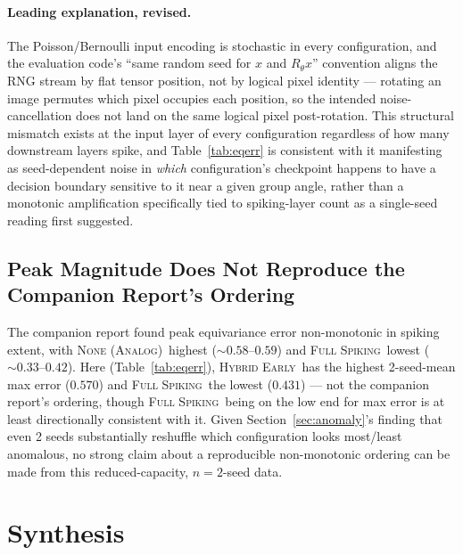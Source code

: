 \documentclass[11pt]{article}
\newcommand{\None}{\textsc{None (Analog)}}
\newcommand{\FullSpiking}{\textsc{Full Spiking}}
\newcommand{\HybridEarly}{\textsc{Hybrid Early}}
\begin{document}
\paragraph{Leading explanation, revised.} The Poisson/Bernoulli input encoding is stochastic in every
configuration, and the evaluation code's ``same random seed for $x$ and $R_\theta x$'' convention
aligns the RNG stream by flat tensor position, not by logical pixel identity --- rotating an image
permutes which pixel occupies each position, so the intended noise-cancellation does not land on the
same logical pixel post-rotation. This structural mismatch exists at the input layer of every
configuration regardless of how many downstream layers spike, and Table~\ref{tab:eqerr} is consistent
with it manifesting as seed-dependent noise in \emph{which} configuration's checkpoint happens to have
a decision boundary sensitive to it near a given group angle, rather than a monotonic amplification
specifically tied to spiking-layer count as a single-seed reading first suggested.

\subsection{Peak Magnitude Does Not Reproduce the Companion Report's Ordering}

The companion report found peak equivariance error non-monotonic in spiking extent, with \None\
highest ($\sim 0.58$--$0.59$) and \FullSpiking\ lowest ($\sim 0.33$--$0.42$). Here (Table~\ref{tab:eqerr}),
\HybridEarly\ has the highest 2-seed-mean max error ($0.570$) and \FullSpiking\ the lowest ($0.431$)
--- not the companion report's ordering, though \FullSpiking\ being on the low end for max error is at
least directionally consistent with it. Given Section~\ref{sec:anomaly}'s finding that even 2 seeds
substantially reshuffle which configuration looks most/least anomalous, no strong claim about a
reproducible non-monotonic ordering can be made from this reduced-capacity, $n=2$-seed data.

\section{Synthesis}
\end{document}

